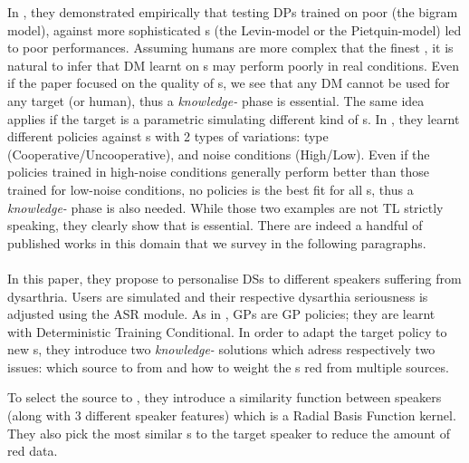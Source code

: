 In \textcite{schatztnann2005-tl-dialogue}, they demonstrated empirically that testing \glspl{DP} trained on poor  (the bigram model), against more sophisticated s (the Levin-model or the Pietquin-model) led to poor performances. Assuming humans are more complex that the finest , it is natural to infer that \gls{DM} learnt on s may perform poorly in real conditions. Even if the paper focused on the quality of s, we see that any \gls{DM} cannot be used for any target  (or human), thus a \textit{knowledge-} phase is essential. The same idea applies if the target  is a parametric  simulating different kind of s. In \textcite{lemon2007-tl-dialogue}, they learnt different policies against s with 2 types of variations:  type (Cooperative/Uncooperative), and noise conditions (High/Low). Even if the policies trained in high-noise conditions  generally perform better than those trained for low-noise conditions, no policies is the best fit for all s, thus a \textit{knowledge-} phase is also needed. While those two examples are not \gls{TL} strictly speaking, they clearly show that   is essential. There are indeed a handful of published works in this domain that we survey in the following paragraphs.

\paragraph{\cite{casanueva2015-tl-dialogue}} In this paper, they propose to personalise \glspl{DS} to different speakers suffering from dysarthria. Users are simulated and their respective dysarthia seriousness is adjusted using the \gls{ASR} module. As in \textcite{Gasic2013}, \glspl{GP} are \gls{GP} policies; they are learnt with Deterministic Training Conditional. In order to adapt the target policy to new s, they introduce two \textit{knowledge-} solutions which adress respectively two issues: which source to  from and how to weight the s red from multiple sources.

To select the source to , they introduce a similarity function between speakers (along with 3 different speaker features) which is a Radial Basis Function kernel. They also pick the most similar s to the target speaker to reduce the amount of red data.

